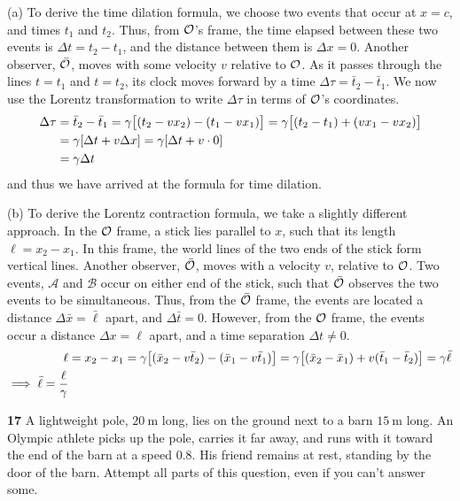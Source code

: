 \documentclass[gr-notes.tex]{subfiles}
\begin{document}
(a)
To derive the time dilation formula, we choose two events that occur at $x = c$, and times $t_1$ and $t_2$. Thus, from $\mathcal{O}$'s frame, the time elapsed between these two events is $\Delta t = t_2 - t_1$, and the distance between them is $\Delta x = 0$. Another observer, $\bar{\mathcal{O}}$, moves with some velocity $v$ relative to $\mathcal{O}$. As it passes through the lines $t = t_1$ and $t = t_2$, its clock moves forward by a time $\Delta \tau = \bar{t}_2 - \bar{t}_1$. We now use the Lorentz transformation to write $\Delta \tau$ in terms of $\mathcal{O}$'s coordinates.
%
\begin{align*}
  \Delta \tau &=
  \bar{t}_2 - \bar{t}_1 =
  \gamma \qty[ (t_2 - v x_2) - (t_1 - v x_1) ] =
  \gamma \qty[ (t_2 - t_1) + (v x_1 - v x_2) ]
  \\ &=
  \gamma \qty[ \Delta t + v \Delta x ] =
  \gamma \qty[ \Delta t + v \cdot 0 ]
  \\ &=
  \gamma \Delta t
\end{align*}
%
and thus we have arrived at the formula for time dilation.

(b)
To derive the Lorentz contraction formula, we take a slightly different approach. In the $\mathcal{O}$ frame, a stick lies parallel to $x$, such that its length $\ell = x_2 - x_1$. In this frame, the world lines of the two ends of the stick form vertical lines. Another observer, $\bar{\mathcal{O}}$, moves with a velocity $v$, relative to $\mathcal{O}$. Two events, $\mathcal{A}$ and $\mathcal{B}$ occur on either end of the stick, such that $\bar{\mathcal{O}}$ observes the two events to be simultaneous. Thus, from the $\bar{\mathcal{O}}$ frame, the events are located a distance $\Delta \bar{x} = \bar{\ell}$ apart, and $\Delta \bar{t} = 0$. However, from the $\mathcal{O}$ frame, the events occur a distance $\Delta x = \ell$ apart, and a time separation $\Delta t \neq 0$.
%
\begin{align*}
  \ell &=
  x_2 - x_1 =
  \gamma \qty[ (\bar{x}_2 - v \bar{t}_2) - (\bar{x}_1 - v \bar{t}_1) ] =
  \gamma \qty[ (\bar{x}_2 - \bar{x}_1) + v (\bar{t}_1 - \bar{t}_2) ] =
  \gamma \bar{\ell}
  \\ \implies
  \bar{\ell} = \frac{\ell}{\gamma}
\end{align*}


\textbf{17}
A lightweight pole, $\SI{20}{\meter}$ long, lies on the ground next to a barn $\SI{15}{\meter}$ long. An Olympic athlete picks up the pole, carries it far away, and runs with it toward the end of the barn at a speed $0.8$. His friend remains at rest, standing by the door of the barn. Attempt all parts of this question, even if you can't answer some.
\end{document}
